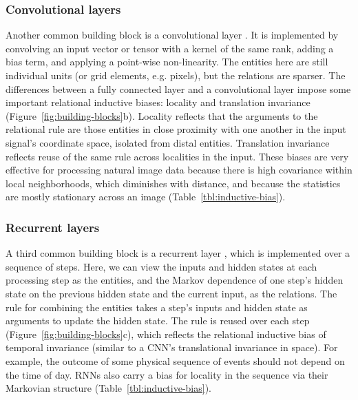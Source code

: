 \subsubsection{Convolutional layers}

Another common building block is a convolutional layer \citep{fukushima80,lecun1989backpropagation}.
It is implemented by convolving an input vector or tensor with a kernel of the same rank, adding a bias term, and applying a point-wise non-linearity.
The entities here are still individual units (or grid elements, e.g. pixels), but the relations are sparser. 
The differences between a fully connected layer and a convolutional layer impose some important relational inductive biases: locality and translation invariance (Figure~\ref{fig:building-blocks}b).
Locality reflects that the arguments to the relational rule are those entities in close proximity with one another in the input signal's coordinate space, isolated from distal entities.
Translation invariance reflects reuse of the same rule across localities in the input.
These biases are very effective for processing natural image data because there is high covariance within local neighborhoods, which diminishes with distance, and because the statistics are mostly stationary across an image (Table~\ref{tbl:inductive-bias}).


\subsubsection{Recurrent layers}

A third common building block is a recurrent layer \citep{elman1990finding}, which is implemented over a sequence of steps.
Here, we can view the inputs and hidden states at each processing step as the entities, and the Markov dependence of one step's hidden state on the previous hidden state and the current input, as the relations.
The rule for combining the entities takes a step's inputs and hidden state as arguments to update the hidden state. The rule is reused over each step (Figure~\ref{fig:building-blocks}c), which reflects the relational inductive bias of temporal invariance (similar to a CNN's translational invariance in space). 
For example, the outcome of some physical sequence of events should not depend on the time of day.
RNNs also carry a bias for locality in the sequence via their Markovian structure (Table~\ref{tbl:inductive-bias}).

